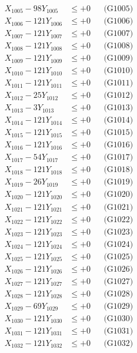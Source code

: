 \documentclass[a4paper,10pt]{article}
\begin{document}
{\begin{align}
X_{1005} - 98Y_{1005} &\leq +0 && \text{(G1005)} \\
X_{1006} - 121Y_{1006} &\leq +0 && \text{(G1006)} \\
X_{1007} - 121Y_{1007} &\leq +0 && \text{(G1007)} \\
X_{1008} - 121Y_{1008} &\leq +0 && \text{(G1008)} \\
X_{1009} - 121Y_{1009} &\leq +0 && \text{(G1009)} \\
X_{1010} - 121Y_{1010} &\leq +0 && \text{(G1010)} \\
\allowbreak
X_{1011} - 121Y_{1011} &\leq +0 && \text{(G1011)} \\
X_{1012} - 25Y_{1012} &\leq +0 && \text{(G1012)} \\
X_{1013} - 3Y_{1013} &\leq +0 && \text{(G1013)} \\
X_{1014} - 121Y_{1014} &\leq +0 && \text{(G1014)} \\
X_{1015} - 121Y_{1015} &\leq +0 && \text{(G1015)} \\
X_{1016} - 121Y_{1016} &\leq +0 && \text{(G1016)} \\
X_{1017} - 54Y_{1017} &\leq +0 && \text{(G1017)} \\
X_{1018} - 121Y_{1018} &\leq +0 && \text{(G1018)} \\
X_{1019} - 26Y_{1019} &\leq +0 && \text{(G1019)} \\
X_{1020} - 121Y_{1020} &\leq +0 && \text{(G1020)} \\
\allowbreak
X_{1021} - 121Y_{1021} &\leq +0 && \text{(G1021)} \\
X_{1022} - 121Y_{1022} &\leq +0 && \text{(G1022)} \\
X_{1023} - 121Y_{1023} &\leq +0 && \text{(G1023)} \\
X_{1024} - 121Y_{1024} &\leq +0 && \text{(G1024)} \\
X_{1025} - 121Y_{1025} &\leq +0 && \text{(G1025)} \\
X_{1026} - 121Y_{1026} &\leq +0 && \text{(G1026)} \\
X_{1027} - 121Y_{1027} &\leq +0 && \text{(G1027)} \\
X_{1028} - 121Y_{1028} &\leq +0 && \text{(G1028)} \\
X_{1029} - 69Y_{1029} &\leq +0 && \text{(G1029)} \\
X_{1030} - 121Y_{1030} &\leq +0 && \text{(G1030)} \\
\allowbreak
X_{1031} - 121Y_{1031} &\leq +0 && \text{(G1031)} \\
X_{1032} - 121Y_{1032} &\leq +0 && \text{(G1032)} \\

\end{align}}
\end{document}
